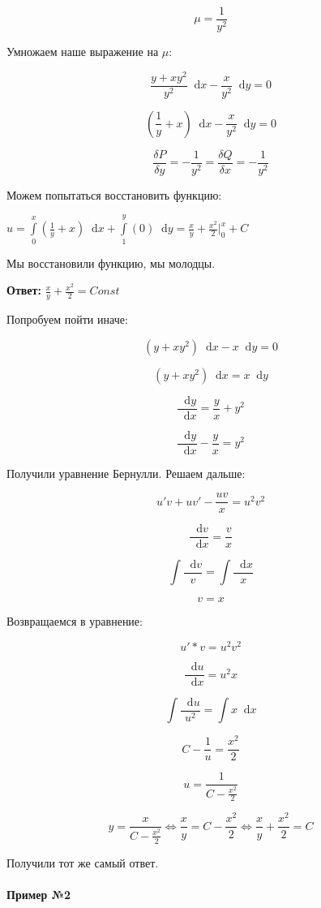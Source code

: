 \documentclass{article}
\newcommand*\diff{\mathop{}\!\mathrm{d}}
\begin{document}
$$\mu = \frac{1}{y^2}$$

Умножаем наше выражение на $\mu$:

$$\frac{y + xy^2}{y^2} \diff x - \frac{x}{y^2} \diff y = 0$$

$$(\frac{1}{y} + x) \diff x - \frac{x}{y^2} \diff y = 0$$

$$\frac{\delta P}{\delta y} = - \frac{1}{y^2} = \frac{\delta Q}{\delta x} = - \frac{1}{y^2}$$

Можем попытаться восстановить функцию:

$u = \int\limits_{0}^{x} (\frac{1}{y} + x) \diff x + \int\limits_{1}^{y} (0) \diff y = \frac{x}{y} + \frac{x^2}{2} \bigg|_{0}^{x} + C$

Мы восстановили функцию, мы молодцы.

\textbf{Ответ:} $\frac{x}{y} + \frac{x^2}{2} = Const$

Попробуем пойти иначе:

$$(y + xy^2) \diff x - x \diff y = 0$$

$$(y + xy^2) \diff x = x \diff y$$

$$\frac{\diff y}{\diff x} = \frac{y}{x} + y^2$$

$$\frac{\diff y}{\diff x} - \frac{y}{x} = y^2$$

Получили уравнение Бернулли. Решаем дальше:

$$u'v + uv' - \frac{u v}{x} = u^2 v^2$$

$$\frac{\diff v}{\diff x} = \frac{v}{x}$$

$$\int \frac{\diff v}{v} = \int \frac{\diff x}{x}$$

$$v = x$$

Возвращаемся в уравнение:

$$u' * v = u^2 v^2$$

$$\frac{\diff u}{\diff x} = u^2 x$$

$$\int \frac{\diff u}{u^2} = \int x \diff x$$

$$C - \frac{1}{u} = \frac{x^2}{2}$$

$$u = \frac{1}{C - \frac{x^2}{2}}$$

$$y = \frac{x}{C - \frac{x^2}{2}} \Longleftrightarrow \frac{x}{y} = C - \frac{x^2}{2} \Longleftrightarrow \frac{x}{y} + \frac{x^2}{2} = C$$

Получили тот же самый ответ.

\paragraph{Пример №2}
\end{document}
